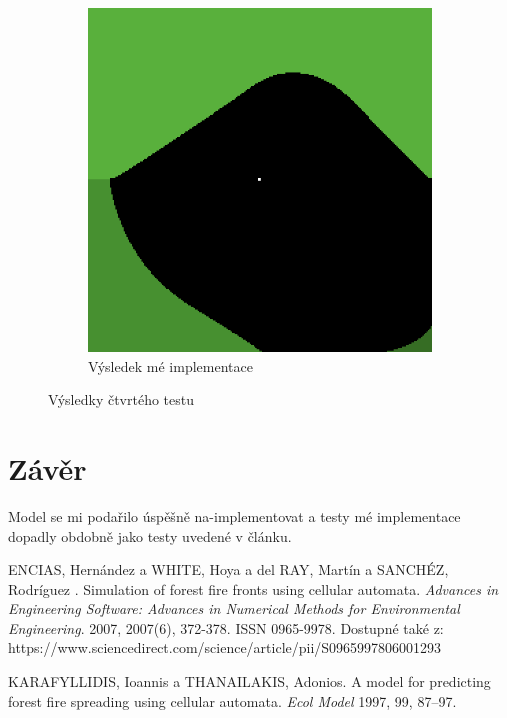 \documentclass[11pt,a4paper]{scrartcl}
\begin{document}
\begin{figure}[H]
\begin{subfigure} {0.3 \textwidth}
			\includegraphics[width=\linewidth]{inhomogeneous-wh}
			\caption{Výsledek mé implementace}
			\label{fig:test-4-res-mine}
		\end{subfigure}
		
		\caption{Výsledky čtvrtého testu}
		\label{fig:test-4-res}
	\end{figure}
	
	\section{Závěr}
	Model se mi podařilo úspěšně na-implementovat a testy mé implementace dopadly obdobně jako testy uvedené v článku.
	
	\begin{thebibliography}{9}
		
		ENCIAS, Hernández a WHITE, Hoya a del RAY, Martín a SANCHÉZ, Rodríguez . Simulation of forest fire fronts using cellular automata. \textit{Advances in Engineering Software: Advances in Numerical Methods for Environmental Engineering}. 2007, 2007(6), 372-378. ISSN 0965-9978. Dostupné také z: https://www.sciencedirect.com/science/article/pii/S0965997806001293
		
		KARAFYLLIDIS, Ioannis a THANAILAKIS, Adonios. A model for predicting forest fire spreading using cellular automata. \textit{Ecol Model} 1997, 99, 87–97.
	\end{thebibliography}
	
\end{document}
